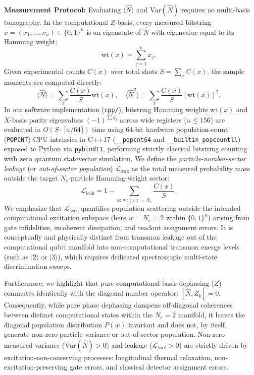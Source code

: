 \documentclass[aps,pra,reprint,superscriptaddress,floatfix,nofootinbib]{revtex4-2}
\begin{document}
\textbf{Measurement Protocol:} Evaluating $\langle \hat{N} \rangle$ and $\text{Var}(\hat{N})$ requires no multi-basis tomography. In the computational $Z$-basis, every measured bitstring $x = (x_1, \dots, x_n) \in \{0, 1\}^n$ is an eigenstate of $\hat{N}$ with eigenvalue equal to its Hamming weight:
\begin{equation}
\text{wt}(x) = \sum_{j=1}^n x_j.
\end{equation}
Given experimental counts $C(x)$ over total shots $S = \sum_x C(x)$, the sample moments are computed directly:
\begin{equation}
\langle \hat{N} \rangle = \sum_x \frac{C(x)}{S} \text{wt}(x), \quad \langle \hat{N}^2 \rangle = \sum_x \frac{C(x)}{S} [\text{wt}(x)]^2.
\end{equation}
In our software implementation (\texttt{cpp/}), bitstring Hamming weights $\text{wt}(x)$ and $X$-basis parity eigenvalues $(-1)^{\sum y_j}$ across wide registers ($n \le 156$) are evaluated in $O(S \cdot \lceil n/64 \rceil)$ time using 64-bit hardware population-count (\texttt{POPCNT}) CPU intrinsics in C++17 (\texttt{\_\_popcnt64} and \texttt{\_\_builtin\_popcountll}) exposed to Python via \texttt{pybind11}, performing strictly classical bitstring counting with zero quantum statevector simulation. We define the \emph{particle-number-sector leakage} (or \emph{out-of-sector population}) $\mathcal{L}_{\text{leak}}$ as the total measured probability mass outside the target $N_e$-particle Hamming-weight sector:
\begin{equation}
\mathcal{L}_{\text{leak}} = 1 - \sum_{x:\,\text{wt}(x) = N_e} \frac{C(x)}{S}.
\label{eq:leakage}
\end{equation}
We emphasize that $\mathcal{L}_{\text{leak}}$ quantifies population scattering outside the intended computational excitation subspace (here $w = N_e = 2$ within $\{0,1\}^n$) arising from gate infidelities, incoherent dissipation, and readout assignment errors. It is conceptually and physically distinct from transmon leakage out of the computational qubit manifold into non-computational transmon energy levels (such as $|2\rangle$ or $|3\rangle$), which requires dedicated spectroscopic multi-state discrimination sweeps.

Furthermore, we highlight that pure computational-basis dephasing ($Z$) commutes identically with the diagonal number operator: $[\hat{N}, Z_k] = 0$. Consequently, while pure phase dephasing dampens off-diagonal coherences between distinct computational states within the $N_e = 2$ manifold, it leaves the diagonal population distribution $P(w)$ invariant and does not, by itself, generate non-zero particle variance or out-of-sector population. Non-zero measured variance ($\text{Var}(\hat{N}) > 0$) and leakage ($\mathcal{L}_{\text{leak}} > 0$) are strictly driven by excitation-non-conserving processes: longitudinal thermal relaxation, non-excitation-preserving gate errors, and classical detector assignment errors.
\end{document}
